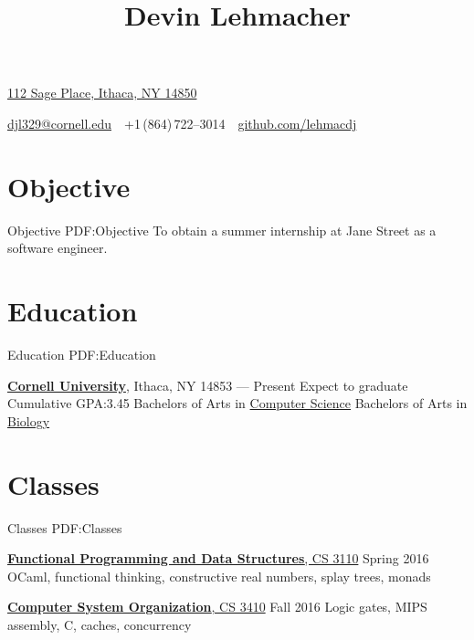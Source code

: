 \documentclass[letterpaper,10pt,oneside]{simpleresume}
\newcommand{\CVAuthor}{Devin Lehmacher}
\newcommand{\CVCompany}{Jane Street}
\newcommand{\CVWebpage}{github.com/lehmacdj}
\begin{document}
\begin{minipage}[t][0pt]{\linewidth}
\pagestyle{empty}

\title{\CVAuthor}

\begin{subtitle}
\href{https://www.google.com/maps/place/112+Sage+Pl+Room-B09,+Ithaca,+NY+14850}
{112 Sage Place, Ithaca, NY 14850}
\par
\href{mailto:djl329@cornell.edu}
{djl329@cornell.edu}
\,\SubBulletSymbol\,
+1\,(864)\,722--3014
\,\SubBulletSymbol\,
\href{https://\CVWebpage}
{\CVWebpage}
\end{subtitle}

\begin{body}

\section%
{Objective}
{Objective}
{PDF:Objective}
To obtain a summer internship at \CVCompany{} as a software engineer.

\section%
{Education}
{Education}
{PDF:Education}

\href{https://www.cornell.edu}
{\textbf{Cornell University}},
Ithaca, NY 14853
\hfill
{} --- Present
\BulletItem%
Expect to graduate 
\BulletItem%
Cumulative GPA:\@ 3.45
\BulletItem%
Bachelors of Arts in
\href{https://www.cs.cornell.edu}{Computer Science}
\BulletItem%
Bachelors of Arts in
\href{https://www.biology.cornell.edu}{Biology}

\section%
{Classes}
{Classes}
{PDF:Classes}

\href{https://www.cs.cornell.edu/courses/cs3110/2016sp/}
{\textbf{Functional Programming and Data Structures}, CS 3110}
\hfill Spring 2016
\BulletItem%
OCaml, functional thinking, constructive real numbers, splay trees, monads

\href{https://www.cs.cornell.edu/courses/cs3410/2016fa/}
{\textbf{Computer System Organization}, CS 3410}
\hfill Fall 2016
\BulletItem%
Logic gates, MIPS assembly, C, caches, concurrency


\end{body}
\end{minipage}
\end{document}
